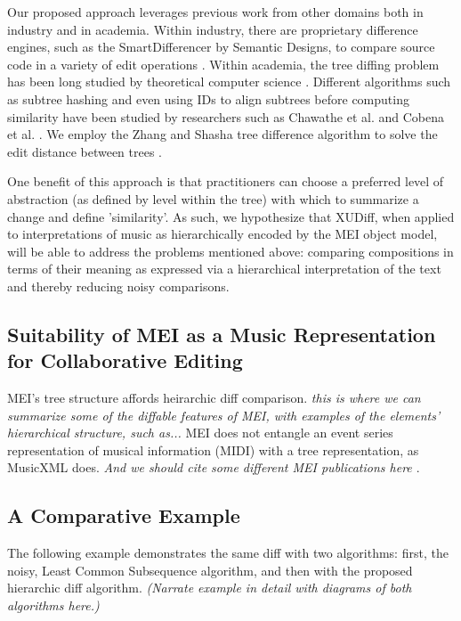 \documentclass{article}
\begin{document}
Our proposed approach leverages previous work from other domains both in
industry and in academia.  Within industry, there are proprietary
difference engines, such as the SmartDifferencer by Semantic Designs,
to compare source code in a variety of edit operations \cite{Designs:qm}.  Within
academia, the tree diffing problem has been long studied by
theoretical computer science \cite{Bille:2005ec}.  Different algorithms such as
subtree hashing and even using IDs to align subtrees before computing
similarity have been studied by researchers such as Chawathe et
al. and Cobena et al. \cite{Chawathe:1996jb,Cobena:2002gd}.  We employ the Zhang and Shasha tree
difference algorithm to solve the edit distance between trees \cite{Zhang:1989ec,Zhang:1989il}.

One benefit of this approach is that practitioners can choose a preferred level of abstraction (as defined by level within the tree) with
which to summarize a change and define 'similarity'.  As such, we
hypothesize that XUDiff, when applied to interpretations of music as
hierarchically encoded by the MEI object model, will be able to
address the problems mentioned above: comparing compositions in terms
of their meaning as expressed via a hierarchical interpretation of the
text and thereby reducing noisy comparisons.

\subsection{Suitability of MEI as a Music Representation for Collaborative Editing}
MEI's tree structure affords heirarchic diff comparison. \emph{this is where we can summarize some of the diffable features of MEI, with examples of the elements' hierarchical structure, such as...} MEI does not entangle an event series representation of musical information (MIDI) with a tree representation, as MusicXML does. \emph{And we should cite some different MEI publications here \cite{roland2002music}}.

 

\subsection{A Comparative Example}
The following example demonstrates the same diff with two algorithms: first, the noisy, Least Common Subsequence algorithm, and then with the proposed hierarchic diff algorithm. \emph{(Narrate example in detail with diagrams of both algorithms here.)}
\end{document}
